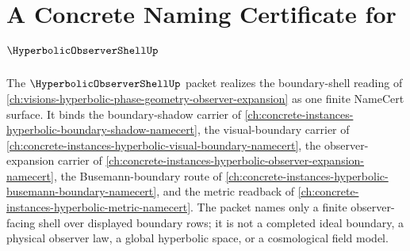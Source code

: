 \chapter{A Concrete Naming Certificate for $\HyperbolicObserverShellUp$}
\label{ch:concrete-instances-hyperbolic-observer-shell-namecert}

The $\HyperbolicObserverShellUp$ packet realizes the boundary-shell reading of \autoref{ch:visions-hyperbolic-phase-geometry-observer-expansion} as one finite NameCert surface. It binds the boundary-shadow carrier of \autoref{ch:concrete-instances-hyperbolic-boundary-shadow-namecert}, the visual-boundary carrier of \autoref{ch:concrete-instances-hyperbolic-visual-boundary-namecert}, the observer-expansion carrier of \autoref{ch:concrete-instances-hyperbolic-observer-expansion-namecert}, the Busemann-boundary route of \autoref{ch:concrete-instances-hyperbolic-busemann-boundary-namecert}, and the metric readback of \autoref{ch:concrete-instances-hyperbolic-metric-namecert}. The packet names only a finite observer-facing shell over displayed boundary rows; it is not a completed ideal boundary, a physical observer law, a global hyperbolic space, or a cosmological field model.

